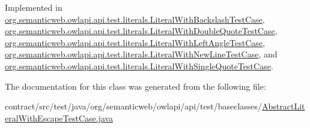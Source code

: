 Implemented in \hyperlink{classorg_1_1semanticweb_1_1owlapi_1_1api_1_1test_1_1literals_1_1_literal_with_backslash_test_case_a9e40fd27257cbca2bcff9e29b4862811}{org.\-semanticweb.\-owlapi.\-api.\-test.\-literals.\-Literal\-With\-Backslash\-Test\-Case}, \hyperlink{classorg_1_1semanticweb_1_1owlapi_1_1api_1_1test_1_1literals_1_1_literal_with_double_quote_test_case_a6ba6b2ef68ba1360156536fb22f94633}{org.\-semanticweb.\-owlapi.\-api.\-test.\-literals.\-Literal\-With\-Double\-Quote\-Test\-Case}, \hyperlink{classorg_1_1semanticweb_1_1owlapi_1_1api_1_1test_1_1literals_1_1_literal_with_left_angle_test_case_ae5704a64c1246b52a303c533886a59df}{org.\-semanticweb.\-owlapi.\-api.\-test.\-literals.\-Literal\-With\-Left\-Angle\-Test\-Case}, \hyperlink{classorg_1_1semanticweb_1_1owlapi_1_1api_1_1test_1_1literals_1_1_literal_with_new_line_test_case_ae898e6b355585c542d454f783b6066c7}{org.\-semanticweb.\-owlapi.\-api.\-test.\-literals.\-Literal\-With\-New\-Line\-Test\-Case}, and \hyperlink{classorg_1_1semanticweb_1_1owlapi_1_1api_1_1test_1_1literals_1_1_literal_with_single_quote_test_case_ac723e7f2eb2b4b4bc15b84aadbb3e5ce}{org.\-semanticweb.\-owlapi.\-api.\-test.\-literals.\-Literal\-With\-Single\-Quote\-Test\-Case}.



The documentation for this class was generated from the following file\-:\begin{DoxyCompactItemize}
\item 
contract/src/test/java/org/semanticweb/owlapi/api/test/baseclasses/\hyperlink{_abstract_literal_with_escape_test_case_8java}{Abstract\-Literal\-With\-Escape\-Test\-Case.\-java}\end{DoxyCompactItemize}
